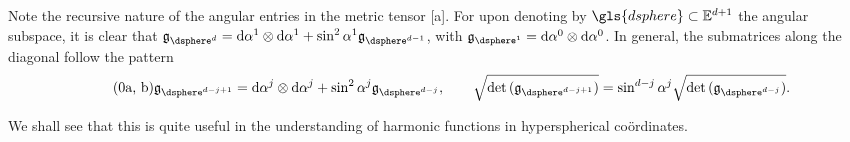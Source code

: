 \noindent
Note the recursive nature of the angular entries in the metric tensor \subeqref{\ref{eq:hyperspherical-metric-tensor}}[a].
For upon denoting by $\gls{dsphere} \subset \euclidean^{d+1}$ the angular subspace, it is clear that $\metrictensor_{\dsphere^d} = \dee\alpha^1 \otimes \dee\alpha^1 + \sin^2{\alpha^1}\metrictensor_{\dsphere^{d-1}}$, with $\metrictensor_{\dsphere^1} = \dee\alpha^0 \otimes \dee\alpha^0$.
In general, the submatrices along the diagonal follow the pattern
%
\begin{subequations}\label{eq:hyperspherical-metric-recurrence}
  \begin{equation}\tag{\theequation{a, b}}
    \metrictensor_{\dsphere^{d-j+1}} = \dee\alpha^j \otimes \dee\alpha^j + \sin^2{\alpha^j} \metrictensor_{\dsphere^{d-j}}, \qquad \sqrt{\det{(\metrictensor_{\dsphere^{d-j+1}})}} = \sin^{d-j}{\alpha^j}\sqrt{\det{(\metrictensor_{\dsphere^{d-j}})}}.
  \end{equation}
\end{subequations}

\noindent
We shall see that this is quite useful in the understanding of harmonic functions in hyperspherical coördinates.
